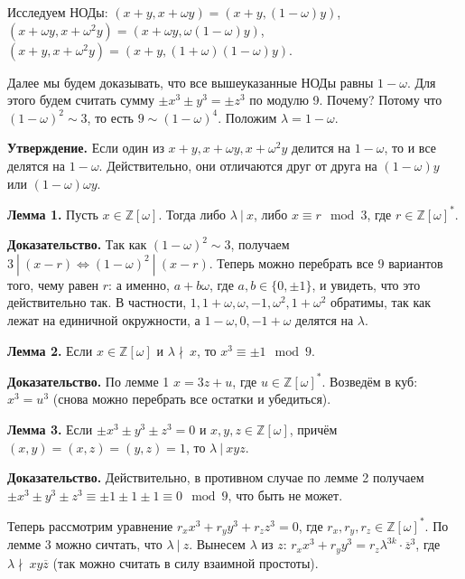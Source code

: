 Исследуем НОДы: $(x + y, x + \omega y) = (x + y, (1 - \omega) y)$, $(x + \omega y, x + \omega^2 y) = (x + \omega y, \omega(1 - \omega) y)$, $(x + y, x + \omega^2 y) = (x + y, (1 + \omega)(1 - \omega) y)$.

Далее мы будем доказывать, что все вышеуказанные НОДы равны $1 - \omega$.
Для этого будем считать сумму $\pm x^3 \pm y^3 = \pm z^3$ по модулю 9.
Почему? Потому что $(1 - \omega)^2 \sim 3$, то есть $9 \sim (1 - \omega)^4$.
Положим $\lambda = 1 - \omega$.

\textbf{Утверждение.} Если один из $x + y, x + \omega y, x + \omega^2 y$ делится на $1 - \omega$, то и все делятся на $1 - \omega$.
Действительно, они отличаются друг от друга на $(1 - \omega) y$ или $(1 - \omega) \omega y$.

\textbf{Лемма 1.} Пусть $x \in \mathbb Z[\omega]$. Тогда либо $\lambda~|~x$, либо $x \equiv r \mod 3$, где $r \in \mathbb Z[\omega]^*$.

\textbf{Доказательство.} Так как $(1 - \omega)^2 \sim 3$, получаем $3~|~(x - r) \iff (1 - \omega)^2~|~(x - r)$.
Теперь можно перебрать все 9 вариантов того, чему равен $r$: а именно, $a + b\omega$, где $a, b \in \{0, \pm 1\}$, и увидеть, что это действительно так.
В частности, $1, 1 + \omega, \omega, -1, \omega^2, 1 + \omega^2$ обратимы, так как лежат на единичной окружности, а $1 - \omega, 0, -1 + \omega$ делятся на $\lambda$.

\QED

\textbf{Лемма 2.} Если $x \in \mathbb Z[\omega]$ и $\lambda \nmid~x$, то $x^3 \equiv \pm 1 \mod 9$.

\textbf{Доказательство.} По лемме 1 $x = 3z + u$, где $u \in \mathbb Z[\omega]^*$.
Возведём в куб: $x^3 = u^3$ (снова можно перебрать все остатки и убедиться).

\QED

\textbf{Лемма 3.} Если $\pm x^3 \pm y^3 \pm z^3 = 0$ и $x, y, z \in \mathbb Z[\omega]$, причём $(x, y) = (x, z) = (y, z) = 1$, то $\lambda~|~xyz$.

\textbf{Доказательство.} Действительно, в противном случае по лемме 2 получаем $\pm x^3 \pm y^3 \pm z^3 \equiv \pm 1 \pm 1 \pm 1 \equiv 0 \mod 9$, что быть не может.

\QED

Теперь рассмотрим уравнение $r_x x^3 + r_y y^3 + r_z z^3 = 0$, где $r_x, r_y, r_z \in \mathbb Z[\omega]^*$.
По лемме 3 можно сичтать, что $\lambda~|~z$.
Вынесем $\lambda$ из $z$: $r_x x^3 + r_y y^3 = r_z \lambda^{3k} \cdot \overline z^3$, где $\lambda \nmid~xy\overline z$ (так можно считать в силу взаимной простоты).

